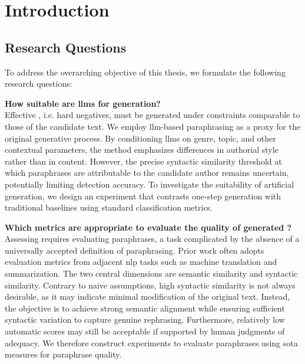 \chapter{Introduction}
\label{chap:introduction}





\section{Research Questions}
\label{sec:research_questions}
To address the overarching objective of this thesis, we formulate the following research questions:
\begin{questions}
    \item \textbf{How suitable are \acp{llm} for \imp{} generation?} \label{enum:rq1} \hfill \\
    Effective \imps{}, i.e. hard negatives, must be generated under constraints comparable to those of the candidate text. 
    We employ \ac{llm}-based paraphrasing as a proxy for the original generative process. 
    By conditioning \acp{llm} on genre, topic, and other contextual parameters, the \imp{} method emphasizes differences in authorial style rather than in content. 
    However, the precise syntactic similarity threshold at which paraphrases are attributable to the candidate author remains uncertain, potentially limiting detection accuracy. 
    To investigate the suitability of artificial \imp{} generation, we design an experiment that contrasts one-step \imp{} generation with traditional baselines using standard classification metrics.

    \item \textbf{Which metrics are appropriate to evaluate the quality of generated \imps{}?} \label{enum:rq2} \hfill \\
    Assessing \imps{} requires evaluating paraphrases, a task complicated by the absence of a universally accepted definition of paraphrasing. 
    Prior work often adopts evaluation metrics from adjacent \ac{nlp} tasks such as machine translation and summarization. 
    The two central dimensions are semantic similarity and syntactic similarity. 
    Contrary to naive assumptions, high syntactic similarity is not always desirable, as it may indicate minimal modification of the original text.
    Instead, the objective is to achieve strong semantic alignment while ensuring sufficient syntactic variation to capture genuine rephrasing. 
    Furthermore, relatively low automatic scores may still be acceptable if supported by human judgments of adequacy. 
    We therefore construct experiments to evaluate paraphrases using \acl{sota} measures for paraphrase quality. 


\end{questions}
